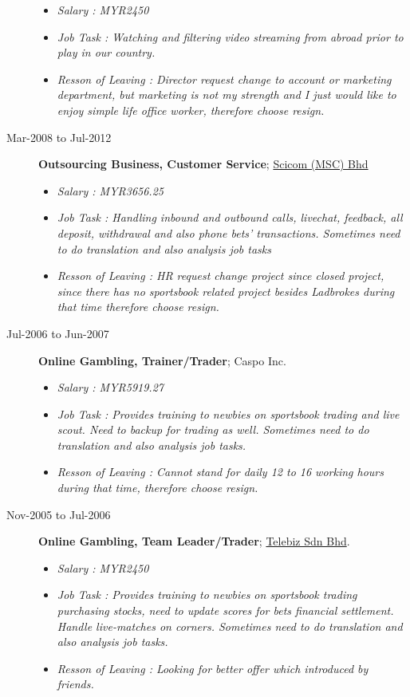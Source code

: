 \documentclass[]{article}
\providecommand{\tightlist}{%
  \setlength{\itemsep}{0pt}\setlength{\parskip}{0pt}}
\begin{document}
\begin{description}
\begin{itemize}
\tightlist
\item
  \emph{Salary : MYR2450}
\item
  \emph{Job Task : Watching and filtering video streaming from abroad
  prior to play in our country.}
\item
  \emph{Resson of Leaving : Director request change to account or
  marketing department, but marketing is not my strength and I just
  would like to enjoy simple life office worker, therefore choose
  resign.}
\end{itemize}
\item[Mar-2008 to Jul-2012]
\textbf{Outsourcing Business, Customer Service};
\href{http://www.scicom-intl.com/}{Scicom (MSC) Bhd}

\begin{itemize}
\tightlist
\item
  \emph{Salary : MYR3656.25}
\item
  \emph{Job Task : Handling inbound and outbound calls, livechat,
  feedback, all deposit, withdrawal and also phone bets' transactions.
  Sometimes need to do translation and also analysis job tasks}
\item
  \emph{Resson of Leaving : HR request change project since closed
  project, since there has no sportsbook related project besides
  Ladbrokes during that time therefore choose resign.}
\end{itemize}
\item[Jul-2006 to Jun-2007]
\textbf{Online Gambling, Trainer/Trader}; Caspo Inc.

\begin{itemize}
\tightlist
\item
  \emph{Salary : MYR5919.27}
\item
  \emph{Job Task : Provides training to newbies on sportsbook trading
  and live scout. Need to backup for trading as well. Sometimes need to
  do translation and also analysis job tasks.}
\item
  \emph{Resson of Leaving : Cannot stand for daily 12 to 16 working
  hours during that time, therefore choose resign.}
\end{itemize}
\item[Nov-2005 to Jul-2006]
\textbf{Online Gambling, Team Leader/Trader};
\href{http://www.telebizness.com/}{Telebiz Sdn Bhd}.

\begin{itemize}
\tightlist
\item
  \emph{Salary : MYR2450}
\item
  \emph{Job Task : Provides training to newbies on sportsbook trading
  purchasing stocks, need to update scores for bets financial
  settlement. Handle live-matches on corners. Sometimes need to do
  translation and also analysis job tasks.}
\item
  \emph{Resson of Leaving : Looking for better offer which introduced by
  friends.}
\end{itemize}
\end{description}
\end{document}
